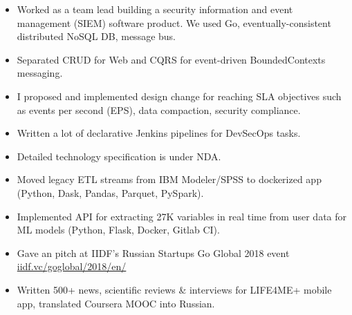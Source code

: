 \documentclass[10pt,a4paper,ragged2e]{altacv}
\begin{document}


\begin{fullwidth}
\makecvheader
\end{fullwidth}




\begin{itemize}
\item
Worked as a team lead building a security information and event management (SIEM) software product. We used Go, eventually-consistent distributed NoSQL DB, message bus.
\item Separated CRUD for Web and CQRS for event-driven BoundedContexts messaging.
\item I proposed and implemented design change for reaching SLA objectives such as events per second (EPS), data compaction, security compliance.
\item Written a lot of declarative Jenkins pipelines for DevSecOps tasks.
\item Detailed technology specification is under NDA.
\end{itemize}


\divider

\begin{itemize}
\item Moved legacy ETL streams from IBM Modeler/SPSS to dockerized app (Python, Dask, Pandas, Parquet, PySpark).
\item Implemented API for extracting 27K variables in real time from user data for ML models (Python, Flask, Docker, Gitlab CI).
\item Gave an pitch at IIDF's Russian Startups Go Global 2018 event \url{iidf.vc/goglobal/2018/en/}
\end{itemize}

\divider

\begin{itemize}
\item Written 500+ news, scientific reviews \& interviews for LIFE4ME+ mobile app, translated Coursera MOOC into Russian.
\end{itemize}
\end{document}
